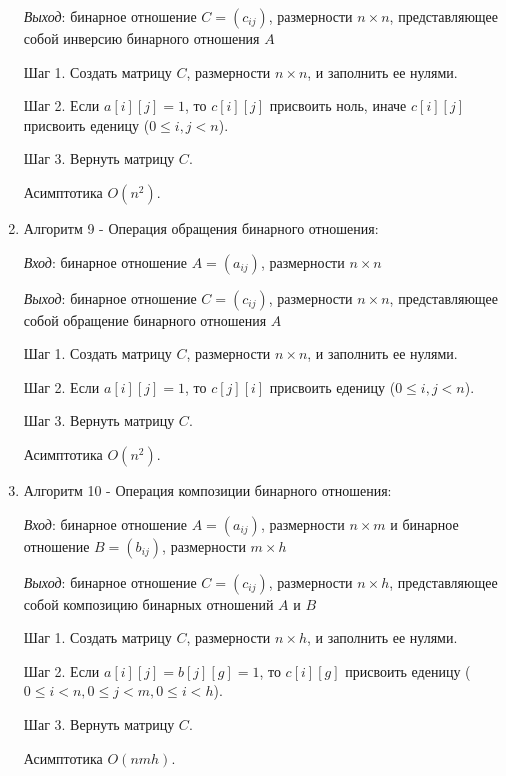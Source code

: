 \documentclass[spec, och, labwork]{shiza}
\begin{document}
\begin{enumerate}
                \textit{Выход}: бинарное отношение $C = (c_{ij})$, размерности $n \times n$, представляющее собой инверсию бинарного отношения $A$

                Шаг 1. Создать матрицу $C$, размерности $n \times n$, и заполнить ее нулями.

                Шаг 2. Если $a[i][j]  = 1$, то $c[i][j]$ присвоить ноль, иначе $c[i][j]$ присвоить еденицу ($0 \leq i, j < n$).

                Шаг 3. Вернуть матрицу $C$.

                Асимптотика $O(n^2)$.

                \item Алгоритм 9 - Операция обращения бинарного отношения:
                
                \textit{Вход}: бинарное отношение $A = (a_{ij})$, размерности $n \times n$

                \textit{Выход}: бинарное отношение $C = (c_{ij})$, размерности $n \times n$, представляющее собой обращение бинарного отношения $A$

                Шаг 1. Создать матрицу $C$, размерности $n \times n$, и заполнить ее нулями.

                Шаг 2. Если $a[i][j]  = 1$, то $c[j][i]$ присвоить еденицу ($0 \leq i, j < n$).

                Шаг 3. Вернуть матрицу $C$.

                Асимптотика $O(n^2)$.

                \item Алгоритм 10 - Операция композиции бинарного отношения:
                
                \textit{Вход}: бинарное отношение $A = (a_{ij})$, размерности $n \times m$ и бинарное отношение $B = (b_{ij})$, размерности $m \times h$

                \textit{Выход}: бинарное отношение $C = (c_{ij})$, размерности $n \times h$, представляющее собой композицию бинарных отношений $A$ и $B$

                Шаг 1. Создать матрицу $C$, размерности $n \times h$, и заполнить ее нулями.

                Шаг 2. Если $a[i][j]  = b[j][g] = 1$, то $c[i][g]$ присвоить еденицу ($0 \leq i < n, 0 \leq j < m, 0 \leq i < h$).

                Шаг 3. Вернуть матрицу $C$.

                Асимптотика $O(nmh)$.
            \end{enumerate}
\end{document}
